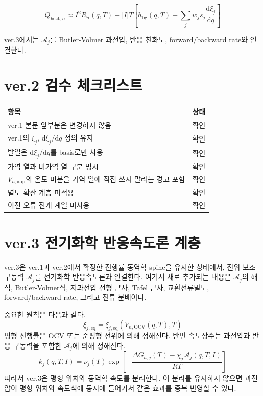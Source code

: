 \documentclass[11pt,a4paper]{article}
\newcommand{\dd}{\mathrm{d}}
\newcommand{\OCV}{\mathrm{OCV}}
\newcommand{\app}{\mathrm{app}}
\newcommand{\eq}{\mathrm{eq}}
\newcommand{\bg}{\mathrm{bg}}
\begin{document}
\begin{equation}
\dot Q_{\mathrm{heat},n}
\approx
I^2R_n(q,T)
+
|I|T\left[h_{\bg}(q,T)+\sum_jw_js_j\frac{\dd\xi_j}{\dd q}\right]
\end{equation}

ver.3에서는 \(\mathcal A_j\)를 Butler-Volmer 과전압, 반응 친화도, forward/backward rate와 연결한다.

\section{ver.2 검수 체크리스트}
\begin{longtable}{p{}p{}}
\toprule
항목 & 상태 \\
\midrule
\endhead
ver.1 본문 앞부분은 변경하지 않음 & 확인 \\
ver.1의 \(\xi_j\), \(\dd\xi_j/\dd q\) 정의 유지 & 확인 \\
발열은 \(\dd\xi_j/\dd q\)를 basis로만 사용 & 확인 \\
가역 열과 비가역 열 구분 명시 & 확인 \\
\(V_{n,\app}\)의 온도 미분을 가역 열에 직접 쓰지 말라는 경고 포함 & 확인 \\
별도 확산 계층 미적용 & 확인 \\
이전 오류 전개 계열 미사용 & 확인 \\
\bottomrule
\end{longtable}



\newpage
\section{ver.3 전기화학 반응속도론 계층}
ver.3은 ver.1과 ver.2에서 확정한 진행률 동역학 spine을 유지한 상태에서, 전위 보조 구동력 \(\mathcal A_j\)를 전기화학 반응속도론과 연결한다. 여기서 새로 추가되는 내용은 \(\mathcal A_j\)의 해석, Butler-Volmer식, 저과전압 선형 근사, Tafel 근사, 교환전류밀도, forward/backward rate, 그리고 전류 분배이다.

중요한 원칙은 다음과 같다.
\begin{equation}
\xi_{j,\eq}=\xi_{j,\eq}\!\left(V_{n,\OCV}(q,T),T\right)
\label{eq:v3_xieq_rule}
\end{equation}
평형 진행률은 OCV 또는 준평형 전위에 의해 정해진다. 반면 속도상수는 과전압과 반응 구동력을 포함한 \(\mathcal A_j\)에 의해 정해진다.
\begin{equation}
k_j(q,T,I)=\nu_j(T)\exp\left[-\frac{\Delta G_{a,j}(T)-\chi_j\mathcal A_j(q,T,I)}{RT}\right]
\label{eq:v3_k_basic}
\end{equation}
따라서 ver.3은 평형 위치와 동역학 속도를 분리한다. 이 분리를 유지하지 않으면 과전압이 평형 위치와 속도식에 동시에 들어가서 같은 효과를 중복 반영할 수 있다.
\end{document}
